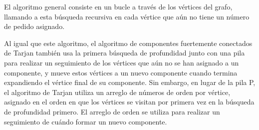 El algoritmo general consiste en un bucle a través de los vértices del grafo, llamando a esta búsqueda recursiva en cada vértice que aún no tiene un número de pedido asignado.

Al igual que este algoritmo, el algoritmo de componentes fuertemente conectados de Tarjan también usa la primera búsqueda de profundidad junto con una pila para realizar un seguimiento de los vértices que aún no se han asignado a un componente, y mueve estos vértices a un nuevo componente cuando termina expandiendo el vértice final de su componente. Sin embargo, en lugar de la pila P, el algoritmo de Tarjan utiliza un arreglo de números de orden por vértice, asignado en el orden en que los vértices se visitan por primera vez en la búsqueda de profundidad primero. El arreglo de orden se utiliza para realizar un seguimiento de cuándo formar un nuevo componente.